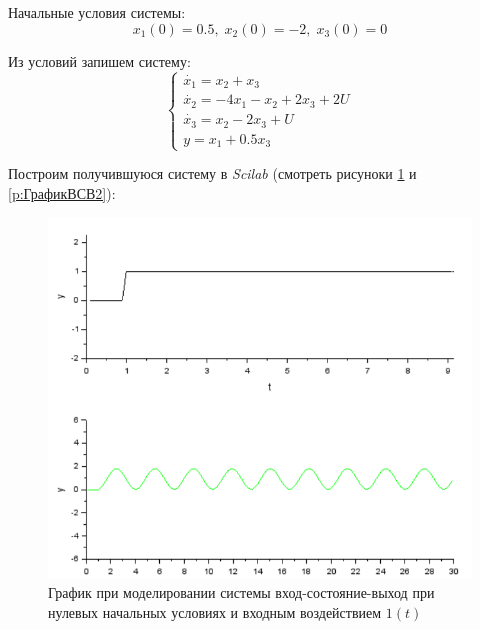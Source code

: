 \documentclass[a4paper, 12pt]{article}
\begin{document}
Начальные условия системы: \\
$$ x_1(0)=0.5, \;  x_2(0)=-2, \; x_3(0)=0 $$

Из условий запишем систему:
$$ \begin{cases} \dot{x_1} = x_2 + x_3 \\ 
\dot{x_2} = -4x_1 - x_2 + 2x_3 + 2U \\
\dot{x_3} = x_2 - 2x_3 + U \\
y = x_1 + 0.5x_3 \end{cases} $$

Построим получившуюся систему в \textit{Scilab} (смотреть рисуноки \ref{p:ГрафикВСВ1} и \ref{p:ГрафикВСВ2}):

\begin{figure}[h!]
	\centering
	\includegraphics[scale=0.7]{plot2_1}
	\caption{График при моделировании системы вход-состояние-выход при нулевых начальных условиях и входным воздействием $1(t)$}
	\label{p:ГрафикВСВ1}
\end{figure}
\end{document}
